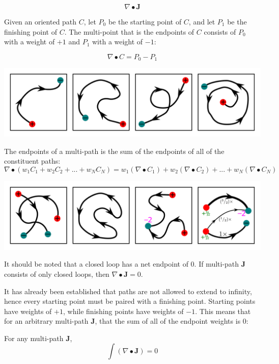 \[\nabla \bullet \mathbf{J}\]

Given an oriented path \(C\), let \(P_0\) be the starting point of \(C\), and let \(P_1\) be the finishing point of \(C\). The multi-point that is the endpoints of \(C\) consists of \(P_0\) with a weight of \(+1\) and \(P_1\) with a weight of \(-1\):

\[\nabla \bullet C = P_0 - P_1\]

\begin{center}
\includegraphics[width = \textwidth]{Boundaries/Path_endpoints/path_endpoint_examples}
\end{center}

The endpoints of a multi-path is the sum of the endpoints of all of the constituent paths:
\[\nabla \bullet (w_1 C_1 + w_2 C_2 + ... + w_N C_N)
= w_1(\nabla \bullet C_1) + w_2(\nabla \bullet C_2) + ... + w_N(\nabla \bullet C_N)\]

\begin{center}
\includegraphics[width = \textwidth]{Boundaries/Path_endpoints/path_endpoint_examples_2}
\end{center}


\begin{thm}
It should be noted that a closed loop has a net endpoint of \(0\). If multi-path \(\mathbf{J}\) consists of only closed loops, then \(\nabla \bullet \mathbf{J} = 0\). 
\end{thm}

It has already been established that paths are not allowed to extend to infinity, hence every starting point must be paired with a finishing point. Starting points have weights of \(+1\), while finishing points have weights of \(-1\). This means that for an arbitrary multi-path \(\mathbf{J}\), that the sum of all of the endpoint weights is \(0\): 
\begin{thm}
For any multi-path \(\mathbf{J}\),
\[\int (\nabla \bullet \mathbf{J}) = 0\] 
\end{thm}

